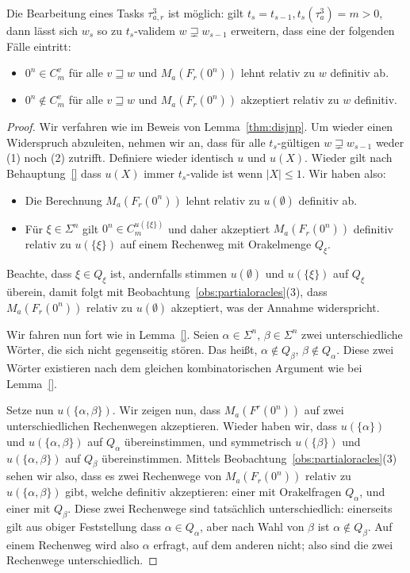 \begin{lemma}
    Die Bearbeitung eines Tasks $\tau^3_{a,r}$ ist möglich: gilt $t_s=t_{s-1}, t_{s}(\tau^3_{a})=m>0$, dann lässt sich $w_{s}$ so zu $t_{s}$-validem $w\sqsupsetneq w_{s-1}$ erweitern, dass eine der folgenden Fälle eintritt:
        \begin{itemize}[nosep,endpenalty=10000]
            \item $0^n\in C_m^v$ für alle $v\sqsupseteq w$ und $M_a(F_r(0^n))$ lehnt relativ zu $w$ definitiv ab.
            \item $0^n\not\in C_m^v$ für alle $v\sqsupseteq w$ und $M_a(F_r(0^n))$ akzeptiert relativ zu $w$ definitiv.
        \end{itemize}
\end{lemma}
\begin{proof}
Wir verfahren wie im Beweis von Lemma~\ref{thm:disjnp}.
Um wieder einen Widerspruch abzuleiten, nehmen wir an, dass für alle $t_{s}$-gültigen $w\sqsupsetneq w_{s-1}$ weder (1) noch (2) zutrifft.
Definiere wieder identisch $u$ und $u(X)$.
Wieder gilt nach Behauptung~\ref{} dass $u(X)$ immer $t_{s}$-valide ist wenn $|X|\leq 1$.
Wir haben also:
\begin{itemize}[nosep]
    \item Die Berechnung $M_a(F_r(0^n))$ lehnt relativ zu $u(\emptyset)$ definitiv ab.
    \item Für $\xi\in \Sigma^{n}$ gilt $0^n\in C_m^{u(\{\xi\})}$ und daher akzeptiert $M_a(F_r(0^n))$ definitiv relativ zu $u(\{\xi\})$ auf einem Rechenweg mit Orakelmenge $Q_\xi$.
\end{itemize}

Beachte, dass $\xi\in Q_\xi$ ist, andernfalls stimmen $u(\emptyset)$ und $u(\{\xi\})$ auf $Q_\xi$ überein, damit folgt mit Beobachtung~\ref{obs:partialoracles}(3), dass $M_a(F_r(0^n))$ relativ zu $u(\emptyset)$ akzeptiert, was der Annahme widerspricht.

Wir fahren nun fort wie in Lemma~\ref{}.
Seien $\alpha\in\Sigma^{n}$, $\beta\in\Sigma^{n}$ zwei unterschiedliche Wörter, die sich nicht gegenseitig stören. Das heißt, $\alpha\not\in Q_\beta$, $\beta\not\in Q_\alpha$.
Diese zwei Wörter existieren nach dem gleichen kombinatorischen Argument wie bei Lemma~\ref{}.

Setze nun $u(\{\alpha, \beta\})$. Wir zeigen nun, dass $M_a(F^r(0^n))$ auf zwei unterschiedlichen Rechenwegen akzeptieren.
Wieder haben wir, dass $u(\{\alpha\})$ und $u(\{\alpha, \beta\})$ auf $Q_\alpha$ übereinstimmen, und symmetrisch $u(\{\beta\})$ und $u(\{\alpha, \beta\})$ auf $Q_\beta$ übereinstimmen.
Mittels Beobachtung~\ref{obs:partialoracles}(3) sehen wir also, dass es zwei Rechenwege von $M_a(F_r(0^n))$ relativ zu $u(\{\alpha, \beta\})$ gibt, welche definitiv akzeptieren: einer mit Orakelfragen $Q_\alpha$, und einer mit $Q_\beta$.
Diese zwei Rechenwege sind tatsächlich unterschiedlich:
einerseits gilt aus obiger Feststellung dass $\alpha\in Q_\alpha$, aber nach Wahl von $\beta$ ist $\alpha\not\in Q_\beta$. Auf einem Rechenweg wird also $\alpha$ erfragt, auf dem anderen nicht; also sind die zwei Rechenwege unterschiedlich.



\end{proof}
